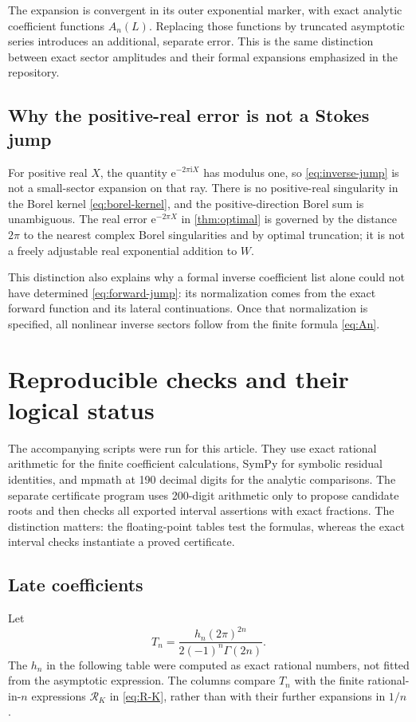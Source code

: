 \documentclass[11pt,a4paper]{article}
\theoremstyle{definition}
\numberwithin{equation}{section}
\newcommand{\ii}{\mathrm{i}}
\newcommand{\ee}{\mathrm{e}}
\begin{document}
The expansion is convergent in its outer exponential marker, with exact analytic coefficient functions $A_n(L)$. Replacing those functions by truncated asymptotic series introduces an additional, separate error. This is the same distinction between exact sector amplitudes and their formal expansions emphasized in the repository.

\subsection{Why the positive-real error is not a Stokes jump}
For positive real $X$, the quantity $\ee^{-2\pi\ii X}$ has modulus one, so \eqref{eq:inverse-jump} is not a small-sector expansion on that ray. There is no positive-real singularity in the Borel kernel \eqref{eq:borel-kernel}, and the positive-direction Borel sum is unambiguous. The real error $\ee^{-2\pi X}$ in \cref{thm:optimal} is governed by the distance $2\pi$ to the nearest complex Borel singularities and by optimal truncation; it is not a freely adjustable real exponential addition to $W$.

This distinction also explains why a formal inverse coefficient list alone could not have determined \eqref{eq:forward-jump}: its normalization comes from the exact forward function and its lateral continuations. Once that normalization is specified, all nonlinear inverse sectors follow from the finite formula \eqref{eq:An}.

\section{Reproducible checks and their logical status}
\label{sec:checks}

The accompanying scripts were run for this article. They use exact rational arithmetic for the finite coefficient calculations, SymPy for symbolic residual identities, and mpmath at 190 decimal digits for the analytic comparisons. The separate certificate program uses 200-digit arithmetic only to propose candidate roots and then checks all exported interval assertions with exact fractions. The distinction matters: the floating-point tables test the formulas, whereas the exact interval checks instantiate a proved certificate.

\subsection{Late coefficients}
Let
\[
 T_n=\frac{h_n(2\pi)^{2n}}{2(-1)^n\Gamma(2n)}.
\]
The $h_n$ in the following table were computed as exact rational numbers, not fitted from the asymptotic expression. The columns compare $T_n$ with the finite rational-in-$n$ expressions $\mathcal R_K$ in \eqref{eq:R-K}, rather than with their further expansions in $1/n$.
\end{document}
